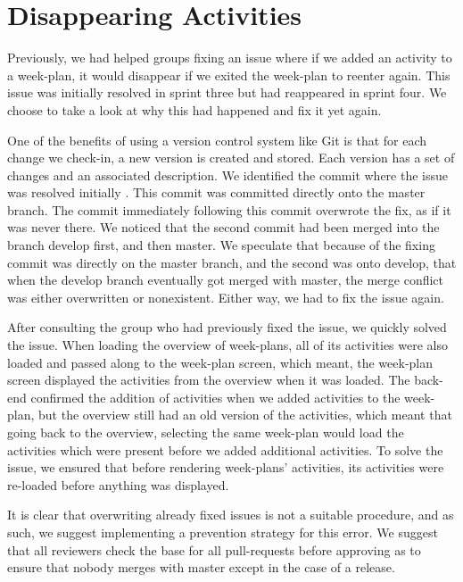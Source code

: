 \section{Disappearing Activities}

Previously, we had helped groups fixing an issue where if we added an activity to a week-plan, it would disappear if we exited the week-plan to reenter again. This issue was initially resolved in sprint three but had reappeared in sprint four. We choose to take a look at why this had happened and fix it yet again.

One of the benefits of using a version control system like Git is that for each change we check-in, a new version is created and stored. Each version has a set of changes and an associated description. We identified the commit where the issue was resolved initially \cite{weekplan_issue_257_fix}. This commit was committed directly onto the master branch. The commit immediately following this commit \cite{weekplan_issue_257_fix-2}  overwrote the fix, as if it was never there. We noticed that the second commit had been merged into the branch develop first, and then master. We speculate that because of the fixing commit was directly on the master branch, and the second was onto develop, that when the develop branch eventually got merged with master, the merge conflict was either overwritten or nonexistent. Either way, we had to fix the issue again. 

After consulting the group who had previously fixed the issue, we quickly solved the issue. When loading the overview of week-plans, all of its activities were also loaded and passed along to the week-plan screen, which meant, the week-plan screen displayed the activities from the overview when it was loaded. The back-end confirmed the addition of activities when we added activities to the week-plan, but the overview still had an old version of the activities, which meant that going back to the overview, selecting the same week-plan would load the activities which were present before we added additional activities. To solve the issue, we ensured that before rendering week-plans' activities, its activities were re-loaded before anything was displayed.

It is clear that overwriting already fixed issues is not a suitable procedure, and as such, we suggest implementing a prevention strategy for this error. We suggest that all reviewers check the base for all pull-requests before approving as to ensure that nobody merges with master except in the case of a release.
